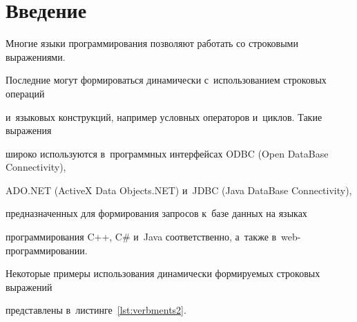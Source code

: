 




\vspace*{-9pt}



















      \thispagestyle{headings}





\section{Введение}


Многие языки программирования позволяют работать со строковыми выражениями. 


Последние могут формироваться динамически с~использованием строковых операций 


и~языковых конструкций, например условных операторов и~циклов. Такие выражения 


широко используются в~программных интерфейсах ODBC (Open DataBase Connectivity), 


ADO.NET (ActiveX Data Objects.NET) и~JDBC (Java DataBase Connectivity), 


предназначенных для формирования запросов к~базе данных на языках 


программирования C++, C\# и~Java соответственно, а~также в~web-программировании. 


Некоторые примеры использования динамически формируемых строковых выражений 


представлены в~листинге~\ref{lst:verbments2}.





\renewcommand{\figurename}{\protect\bf Листинг}





